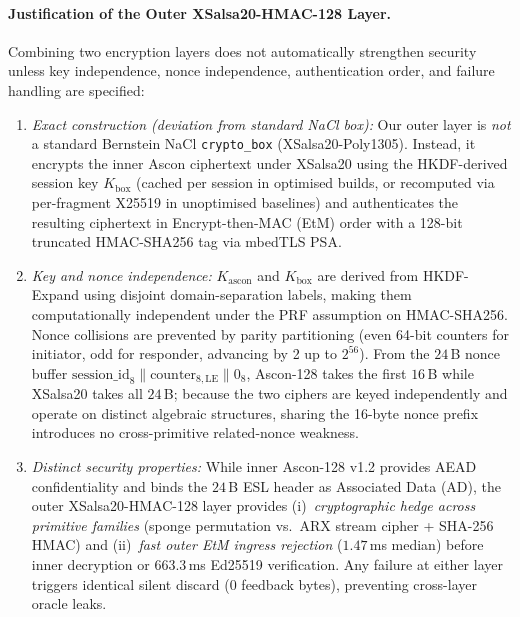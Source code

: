 \documentclass[conference]{IEEEtran}
\begin{document}
\paragraph{Justification of the Outer XSalsa20-HMAC-128 Layer.} Combining two encryption layers does not automatically strengthen security unless key independence, nonce independence, authentication order, and failure handling are specified:
\begin{enumerate}
\setlength{\itemsep}{0pt}\setlength{\parskip}{0pt}
\item \textit{Exact construction (deviation from standard NaCl box):} Our outer layer is \emph{not} a standard Bernstein NaCl \texttt{crypto\_box} (XSalsa20-Poly1305). Instead, it encrypts the inner Ascon ciphertext under XSalsa20 using the HKDF-derived session key $K_{\text{box}}$ (cached per session in optimised builds, or recomputed via per-fragment X25519 in unoptimised baselines) and authenticates the resulting ciphertext in Encrypt-then-MAC (EtM) order with a 128-bit truncated HMAC-SHA256 tag via mbedTLS PSA.
\item \textit{Key and nonce independence:} $K_{\text{ascon}}$ and $K_{\text{box}}$ are derived from HKDF-Expand using disjoint domain-separation labels, making them computationally independent under the PRF assumption on HMAC-SHA256. Nonce collisions are prevented by parity partitioning (even 64-bit counters for initiator, odd for responder, advancing by 2 up to $2^{56}$). From the $24$\,B nonce buffer $\text{session\_id}_{8} \parallel \text{counter}_{8,\text{LE}} \parallel 0_{8}$, Ascon-128 takes the first $16$\,B while XSalsa20 takes all $24$\,B; because the two ciphers are keyed independently and operate on distinct algebraic structures, sharing the 16-byte nonce prefix introduces no cross-primitive related-nonce weakness.
\item \textit{Distinct security properties:} While inner Ascon-128 v1.2 provides AEAD confidentiality and binds the $24$\,B ESL header as Associated Data (AD), the outer XSalsa20-HMAC-128 layer provides (i)~\emph{cryptographic hedge across primitive families} (sponge permutation vs.\ ARX stream cipher + SHA-256 HMAC) and (ii)~\emph{fast outer EtM ingress rejection} ($1.47$\,ms median) before inner decryption or $663.3$\,ms Ed25519 verification. Any failure at either layer triggers identical silent discard (0 feedback bytes), preventing cross-layer oracle leaks.
\end{enumerate}
\end{document}
